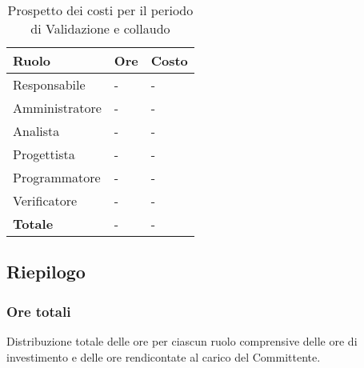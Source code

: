 		\begin{longtable}{ 
			>{\centering}p{} 
			>{\centering}p{}
			>{\centering\arraybackslash}p{} }

			\caption {Prospetto dei costi per il periodo di Validazione e collaudo}	\\
			
			\textbf{\color{white}Ruolo} & 
			\textbf{\color{white}Ore} & 
			\textbf{\color{white}Costo }
			\tabularnewline  
			\endhead
			
			Responsabile & - & - \\
			Amministratore & - & - \\
			Analista & - & - \\
			Progettista & - & - \\
			Programmatore & - & - \\
			Verificatore & - & - \\
			\textbf{Totale} & - & - \\
		\end{longtable}
		
	
\subsection{Riepilogo}
	\subsubsection{Ore totali}
			Distribuzione totale delle ore per ciascun ruolo comprensive delle ore di investimento e delle ore rendicontate al carico del Committente.


